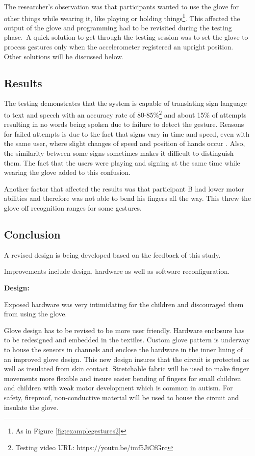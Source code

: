 The researcher's observation was that participants wanted to use the glove for other things while wearing it, like playing or holding things\footnote{As in Figure \ref{fig:examplegestures2}}. This affected the output of the glove and programming had to be revisited during the testing phase. A quick solution to get through the testing session was to set the glove to process gestures only when the accelerometer registered an upright position. Other solutions will be discussed below. 

\subsection{Results}

The testing demonstrates that the system is capable of translating sign language to text and speech with an accuracy rate of 80-85\%\footnote{Testing video URL: https://youtu.be/imf5JiCfGrc} and about 15\% of attempts resulting in no words being spoken due to failure to detect the gesture. Reasons for failed attempts is due to the fact that signs vary in time and speed, even with the same user, where slight changes of speed and position of hands occur \parencite{Premaratne2010}. Also, the similarity between some signs sometimes makes it difficult to distinguish them. The fact that the users were playing and signing at the same time while wearing the glove added to this confusion. 

Another factor that affected the results was that participant B had lower motor abilities and therefore was not able to bend his fingers all the way. This threw the glove off recognition ranges for some gestures.

\subsection{Conclusion}

A revised design is being developed based on the feedback of this study. 

Improvements include design, hardware as well as software reconfiguration. 

\textbf{Design:}

Exposed hardware was very intimidating for the children and discouraged them from using the glove.

Glove design has to be revised to be more user friendly. Hardware enclosure has to be redesigned and embedded in the textiles. Custom glove pattern is underway to house the sensors in channels and enclose the hardware in the inner lining of an improved glove design. This new design insures that the circuit is protected as well as insulated from skin contact. Stretchable fabric will be used to make finger movements more flexible and insure easier bending of fingers for small children and children with weak motor development which is common in autism. For safety, fireproof, non-conductive material will be used to house the circuit and insulate the glove.


